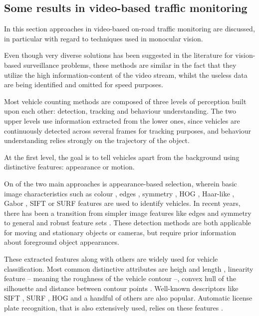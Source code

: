 \subsection{Some results in video-based traffic monitoring}
In this section approaches in video-based on-road traffic monitoring are discussed, in particular with regard to techniques used in monocular vision.

Even though very diverse solutions has been suggested in the literature for vision-based surveillance problems, these methods are similar in the fact that they utilize the high information-content of the video stream, whilst the useless data are being identified and omitted for speed purposes.

Most vehicle counting methods are composed of three levels of perception built upon each other: detection, tracking and behaviour understanding.
The two upper levels use information extracted from the lower ones, since vehicles are continuously detected across several frames for tracking purposes, and behaviour understanding relies strongly on the trajectory of the object.

At the first level, the goal is to tell vehicles apart from the background using distinctive features: appearance or motion.

On of the two main approaches is appearance-based selection, wherein basic image characteristics such as colour \cite{Chang2005}, edges \cite{Blanc2007}, symmetry \cite{Aytekin2010}, HOG \cite{Niknejad2012}, Haar-like \cite{Sivaraman2012}, Gabor \cite{Zhang2006}, SIFT \cite{Zhang2011} or SURF \cite{Lin2012} features are used to identify vehicles.
In recent years, there has been a transition from simpler image features like edges and symmetry to general and robust feature sets \cite{Sivaraman2012}.
These detection methods are both applicable for moving and stationary objects or cameras, but require prior information about foreground object appearances.

These extracted features along with others are widely used for vehicle classification.
Most common distinctive attributes are heigh and length \cite{Huang2004}, linearity feature -- meaning the roughness of the vehicle contour \cite{Zhang2008} --, convex hull of the silhouette \cite{Buch2010} and distance between contour points \cite{Lou2005}.
Well-known descriptors like SIFT \cite{Zhang2011}, SURF \cite{Lin2012}, HOG \cite{Niknejad2012} and a handful of others are also popular.
Automatic license plate recognition, that is also extensively used, relies on these features \cite{Luvizon2016}. 

